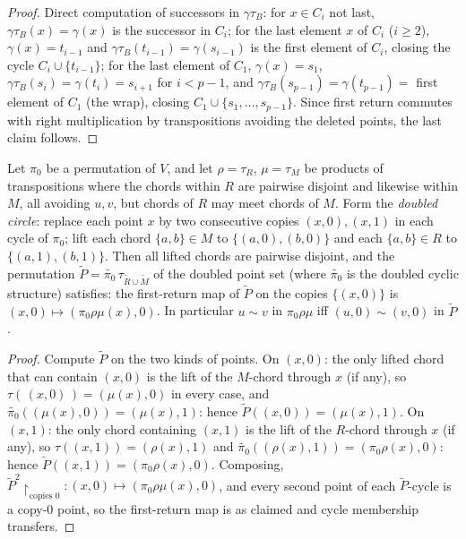 \begin{proof}
Direct computation of successors in $\gamma\tau_B$: for $x\in C_i$ not
last, $\gamma\tau_B(x)=\gamma(x)$ is the successor in $C_i$; for the
last element $x$ of $C_i$ ($i\ge2$), $\gamma(x)=t_{i-1}$ and
$\gamma\tau_B(t_{i-1})=\gamma(s_{i-1})$ is the first element of $C_i$,
closing the cycle $C_i\cup\{t_{i-1}\}$; for the last element of $C_1$,
$\gamma(x)=s_1$, $\gamma\tau_B(s_i)=\gamma(t_i)=s_{i+1}$ for $i<p-1$,
and $\gamma\tau_B(s_{p-1})=\gamma(t_{p-1})=$ first element of $C_1$
(the wrap), closing $C_1\cup\{s_1,\dots,s_{p-1}\}$.  Since first
return commutes with right multiplication by transpositions avoiding
the deleted points, the last claim follows.
\end{proof}

\begin{lemma}\label{lem:split}
Let $\pi_0$ be a permutation of $V$, and let $\rho=\tau_R$,
$\mu=\tau_M$ be products of transpositions where the chords within $R$
are pairwise disjoint and likewise within $M$, all avoiding $u,v$, but
chords of $R$ may meet chords of $M$.  Form the \emph{doubled circle}:
replace each point $x$ by two consecutive copies $(x,0),(x,1)$ in each
cycle of $\pi_0$; lift each chord $\{a,b\}\in M$ to
$\{(a,0),(b,0)\}$ and each $\{a,b\}\in R$ to $\{(a,1),(b,1)\}$.  Then
all lifted chords are pairwise disjoint, and the permutation
$\widetilde P=\widetilde{\pi_0}\,\tau_{\widetilde R\cup\widetilde M}$
of the doubled point set (where $\widetilde{\pi_0}$ is the doubled
cyclic structure) satisfies: the first-return map of $\widetilde P$ on
the copies $\{(x,0)\}$ is $(x,0)\mapsto(\pi_0\rho\mu(x),0)$.  In
particular $u\sim v$ in $\pi_0\rho\mu$ iff $(u,0)\sim(v,0)$ in
$\widetilde P$.
\end{lemma}

\begin{proof}
Compute $\widetilde P$ on the two kinds of points.  On $(x,0)$: the
only lifted chord that can contain $(x,0)$ is the lift of the
$M$-chord through $x$ (if any), so
$\tau(\,(x,0)\,)=(\mu(x),0)$ in every case, and
$\widetilde{\pi_0}((\mu(x),0))=(\mu(x),1)$: hence $\widetilde
P((x,0))=(\mu(x),1)$.  On $(x,1)$: the only chord containing $(x,1)$
is the lift of the $R$-chord through $x$ (if any), so
$\tau((x,1))=(\rho(x),1)$ and
$\widetilde{\pi_0}((\rho(x),1))=(\pi_0\rho(x),0)$: hence $\widetilde
P((x,1))=(\pi_0\rho(x),0)$.  Composing,
$\widetilde P^2\!\restriction_{\text{copies }0}:
(x,0)\mapsto(\pi_0\rho\mu(x),0)$, and every second point of each
$\widetilde P$-cycle is a copy-$0$ point, so the first-return map is
as claimed and cycle membership transfers.
\end{proof}

